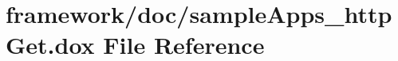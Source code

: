 \hypertarget{sample_apps__http_get_8dox}{}\section{framework/doc/sample\+Apps\+\_\+http\+Get.dox File Reference}
\label{sample_apps__http_get_8dox}
